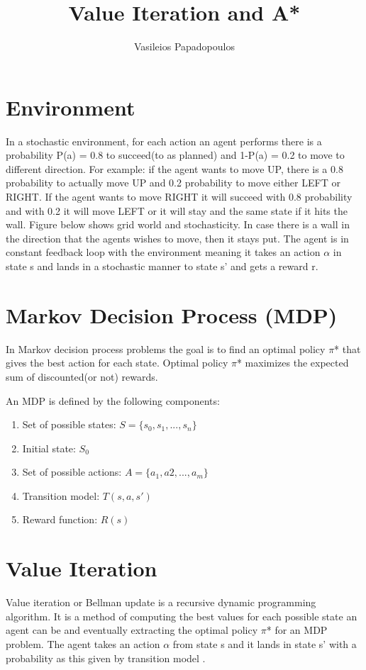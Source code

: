 \documentclass[10pt,a4paper,twocolumn]{article}
\title{Value Iteration and A*}
\author{Vasileios Papadopoulos}
\begin{document}
	\maketitle
	\section{Environment}
	
	In a stochastic environment, for each action an agent performs there is a probability P(a) = 0.8 to succeed(to as planned) and 1-P(a) = 0.2 to move to different direction. For example: if the agent wants to move UP, there is a 0.8 probability to actually move UP and 0.2 probability to move either LEFT or RIGHT. If the agent wants to move RIGHT it will succeed with 0.8 probability and with 0.2 it will move LEFT or it will stay and the same state if it hits the wall. Figure below shows grid world and stochasticity.
	In case there is a wall in the direction that the agents wishes to move, then it stays put.
	The agent is in constant feedback loop with the environment meaning it takes an action $\alpha$ in state s and lands in a stochastic manner to state s’ and gets a reward r.
	
	\section{Markov Decision Process (MDP)}
	
	In Markov decision process problems the goal is to find an optimal policy $\pi$* that gives  the best action for each state. Optimal policy $\pi$* maximizes the expected sum of discounted(or not) rewards.
	
	An MDP is defined by the following components:
	\begin{enumerate}
		\item Set of possible states: $S = \{ s_{0}, s_{1}, ..., s_{n} \}$

		\item Initial state: $S_{0}$

		\item Set of possible actions: $A = \{ a_{1}, a{2}, ..., a_{m} \}$

		\item Transition model: $T(s, a, s')$

		\item Reward function: $R(s)$
	\end{enumerate}
	 
	
	\section{Value Iteration}
	Value iteration or Bellman update is a recursive dynamic programming algorithm. It is a method of computing the best values for each possible state an agent can be and eventually extracting the optimal policy $\pi$* for an MDP problem. The agent takes an action $\alpha$ from state s and it lands in state s’ with a probability as this given by transition model . 
	
\end{document}
